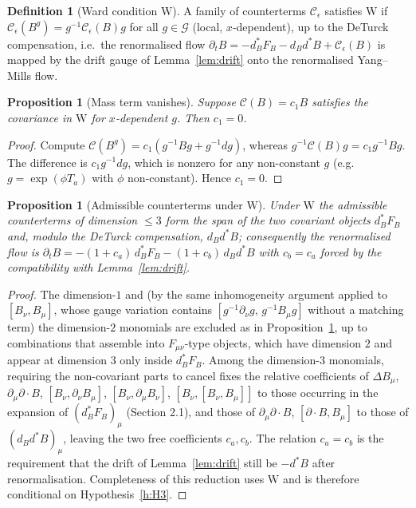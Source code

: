 \documentclass[11pt,a4paper]{article}
\newtheorem{proposition}[theorem]{Proposition}
\theoremstyle{definition}
\newtheorem{definition}[theorem]{Definition}
\theoremstyle{remark}
\newcommand{\CalG}{\mathcal{G}}
\begin{document}
\begin{definition}[Ward condition $\mathrm W$]\label{def:ward}
A family of counterterms $\mathcal C_\epsilon$ satisfies $\mathrm W$ if $\mathcal C_\epsilon(B^g)=g^{-1}\mathcal C_\epsilon(B)g$ for all $g\in\CalG$ (local, $x$-dependent), up to the DeTurck compensation, i.e.\ the renormalised flow $\partial_tB=-d_B^*F_B-d_Bd^*B+\mathcal C_\epsilon(B)$ is mapped by the drift gauge of Lemma~\ref{lem:drift} onto the renormalised Yang--Mills flow.
\end{definition}

\begin{proposition}[Mass term vanishes]\label{prop:mass}
Suppose $\mathcal C(B)=c_1B$ satisfies the covariance in $\mathrm W$ for $x$-dependent $g$. Then $c_1=0$.
\end{proposition}
\begin{proof}
Compute $\mathcal C(B^g)=c_1(g^{-1}Bg+g^{-1}dg)$, whereas $g^{-1}\mathcal C(B)g=c_1g^{-1}Bg$. The difference is $c_1g^{-1}dg$, which is nonzero for any non-constant $g$ (e.g.\ $g=\exp(\phi T_a)$ with $\phi$ non-constant). Hence $c_1=0$.
\end{proof}

\begin{proposition}[Admissible counterterms under $\mathrm W$]\label{prop:class}
Under $\mathrm W$ the admissible counterterms of dimension $\le3$ form the span of the two covariant objects $d_B^*F_B$ and, modulo the DeTurck compensation, $d_Bd^*B$; consequently the renormalised flow is $\partial_tB=-(1+c_a)\,d_B^*F_B-(1+c_b)\,d_Bd^*B$ with $c_b=c_a$ forced by the compatibility with Lemma~\ref{lem:drift}.
\end{proposition}
\begin{proof}
The dimension-$1$ and (by the same inhomogeneity argument applied to $[B_\nu,B_\mu]$, whose gauge variation contains $[g^{-1}\partial_\nu g,\,g^{-1}B_\mu g]$ without a matching term) the dimension-$2$ monomials are excluded as in Proposition~\ref{prop:mass}, up to combinations that assemble into $F_{\mu\nu}$-type objects, which have dimension $2$ and appear at dimension $3$ only inside $d_B^*F_B$. Among the dimension-$3$ monomials, requiring the non-covariant parts to cancel fixes the relative coefficients of $\Delta B_\mu$, $\partial_\mu\partial\!\cdot\!B$, $[B_\nu,\partial_\nu B_\mu]$, $[B_\nu,\partial_\mu B_\nu]$, $[B_\nu,[B_\nu,B_\mu]]$ to those occurring in the expansion of $(d_B^*F_B)_\mu$ (Section 2.1), and those of $\partial_\mu\partial\!\cdot\!B$, $[\partial\!\cdot\!B,B_\mu]$ to those of $(d_Bd^*B)_\mu$, leaving the two free coefficients $c_a,c_b$. The relation $c_a=c_b$ is the requirement that the drift of Lemma~\ref{lem:drift} still be $-d^*B$ after renormalisation. Completeness of this reduction uses $\mathrm W$ and is therefore conditional on Hypothesis~\ref{h:H3}.
\end{proof}
\end{document}
